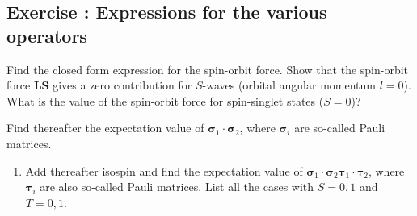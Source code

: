 \documentclass[graybox,sectrefs,envcountresetchap,open=right]{svmonodo}
\newenvironment{doconceexercise}{}{}
\newcounter{doconceexercisecounter}
\begin{document}
\begin{doconceexercise}

\subsection*{Exercise \thedoconceexercisecounter: Expressions for the various operators}



Find the closed form expression for the spin-orbit force. Show that the spin-orbit force {\bf LS} gives a zero
contribution for $S$-waves (orbital angular momentum $l=0$).   What is the value of the spin-orbit force for spin-singlet states ($S=0$)?

Find thereafter the expectation value of $\mathbf{\sigma}_1\cdot\mathbf{\sigma}_2$, where $\mathbf{\sigma}_i$ are so-called Pauli matrices. 
\begin{enumerate}
\item Add thereafter isospin and find the expectation value of $\mathbf{\sigma}_1\cdot\mathbf{\sigma}_2\mathbf{\tau}_1\cdot\mathbf{\tau}_2$, where $\mathbf{\tau}_i$ are also so-called Pauli matrices. List all the cases with $S=0,1$ and $T=0,1$.
\end{enumerate}

\noindent
\end{doconceexercise}
\end{document}
